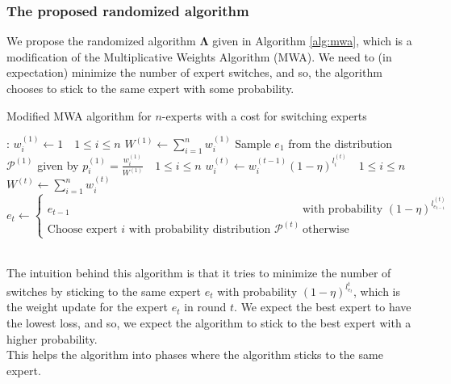 \documentclass[11pt]{article}
\begin{document}
\subsubsection*{The proposed randomized algorithm}
We propose the randomized algorithm $\mathbf{\Lambda}$ given in Algorithm \ref{alg:mwa}, which is
a modification of the Multiplicative Weights Algorithm (MWA). We need to (in expectation)
minimize the number of expert switches, and so, the algorithm chooses to stick to the
same expert with some probability.
\begin{algorithm}
    \caption{Modified MWA algorithm for $n$-experts with a cost for switching experts}
    \label{alg:mwa}
    \begin{algorithmic}[1]
        :
            \State $w_{i}^{(1)} \gets 1 \quad 1 \leq i \leq n$
            \State $W^{(1)} \gets \sum_{i=1}^{n} w_{i}^{(1)}$
            \State Sample $e_{1}$ from the distribution $\mathcal{P}^{(1)}$ given by $p_{i}^{(1)} = \frac{w_{i}^{(1)}}{W^{(1)}} \quad 1 \leq i \leq n$
                \State $w_{i}^{(t)} \gets w_{i}^{(t-1)} (1 - \eta)^{l_{i}^{(t)}} \quad 1 \leq i \leq n$
                \State $W^{(t)} \gets \sum_{i=1}^{n} w_{i}^{(t)}$
                \State $e_{t} \gets \begin{cases}
                    e_{t-1} & \text{with probability } (1 - \eta)^{l_{e_{t-1}}^{(t)}} \\
                    \text{Choose expert } i \text{ with probability distribution } \mathcal{P}^{(t)} & \text{otherwise}
                \end{cases}$
            \EndFor
        \EndProcedure
    \end{algorithmic}
\end{algorithm}
\vspace*{0pt} \\
The intuition behind this algorithm is that it tries to minimize the number of switches
by sticking to the same expert $e_{t}$ with probability $(1 - \eta)^{l_{e_{t}}^{t}}$, which is
the weight update for the expert $e_{t}$ in round $t$. We expect the best expert
to have the lowest loss, and so, we expect the algorithm to stick to the best expert
with a higher probability. \\
This helps the algorithm into phases where the algorithm sticks to the same expert.
\end{document}
